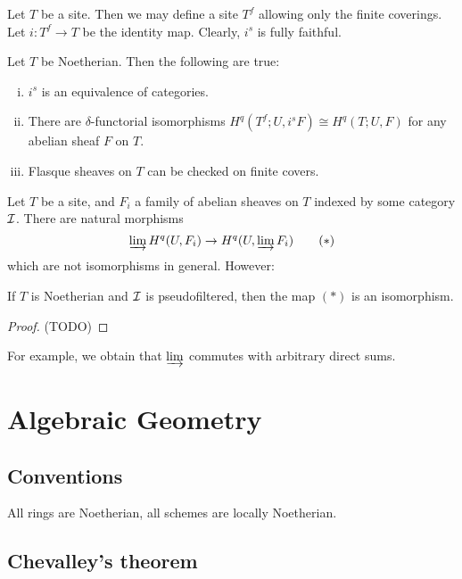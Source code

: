 \documentclass[11pt]{amsart}
\begin{document}
Let $T$ be a site. Then we may define a site $T^f$ allowing only the finite coverings. Let $i:T^f\to T$ be the identity map. Clearly, $i^s$ is fully faithful.

\begin{prop}
    Let $T$ be Noetherian. Then the following are true:
    \begin{enumerate}[(i)]
        \item $i^s$ is an equivalence of categories.
        \item There are $\delta$-functorial isomorphisms $H^q(T^f; U, i^sF) \cong H^q(T; U, F)$ for any abelian sheaf $F$ on $T$.
        \item Flasque sheaves on $T$ can be checked on finite covers.
    \end{enumerate}
\end{prop}

Let $T$ be a site, and $F_i$ a family of abelian sheaves on $T$ indexed by some category $\mathcal{I}$. There are natural morphisms
\[\varinjlim H^q(U, F_i) \to H^q(U, \varinjlim F_i) \tag{$\ast$}\]
which are not isomorphisms in general. However:

\begin{thm}
    If $T$ is Noetherian and $\mathcal{I}$ is pseudofiltered, then the map $(\ast)$ is an isomorphism.
\end{thm}

\begin{proof}
    (TODO)
\end{proof}

For example, we obtain that $\varinjlim$ commutes with arbitrary direct sums.



\newpage

\section{Algebraic Geometry}


\subsection{Conventions}

All rings are Noetherian, all schemes are locally Noetherian.

\subsection{Chevalley's theorem}
\end{document}
